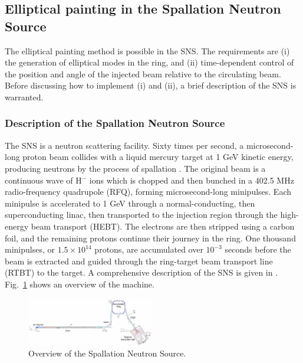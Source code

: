 \subsection{Elliptical painting in the Spallation Neutron Source}

The elliptical painting method is possible in the SNS. The requirements are (i) the generation of elliptical modes in the ring, and (ii) time-dependent control of the position and angle of the injected beam relative to the circulating beam. Before discussing how to implement (i) and (ii), a brief description of the SNS is warranted.


\subsubsection{Description of the Spallation Neutron Source}

The SNS is a neutron scattering facility. Sixty times per second, a microsecond-long proton beam collides with a liquid mercury target at 1 GeV kinetic energy, producing neutrons by the process of spallation \cite{Russell1990}. The original beam is a continuous wave of H$^-$ ions which is chopped and then bunched in a 402.5 MHz radio-frequency quadrupole (RFQ), forming microsecond-long minipulses. Each minipulse is accelerated to 1 GeV through a normal-conducting, then superconducting linac, then transported to the injection region through the high-energy beam transport (HEBT). The electrons are then stripped using a carbon foil, and the remaining protons continue their journey in the ring. One thousand minipulses, or $1.5 \times 10^{14}$ protons, are accumulated over $10^{-3}$ seconds before the beam is extracted and guided through the ring-target beam transport line (RTBT) to the target. A comprehensive description of the SNS is given in \cite{Henderson2014}. Fig.~\ref{fig:SNS} shows an overview of the machine.
%
\begin{figure}[!p]
    \centering
    \includegraphics[angle=-90, width=0.5\textwidth]{Images/chapter1/SNS.png}
    \caption{Overview of the Spallation Neutron Source.}
    \label{fig:SNS}
\end{figure}
%

